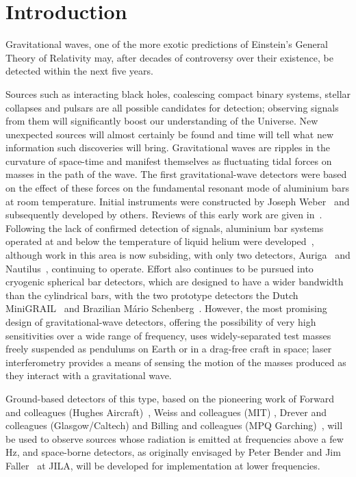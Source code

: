 \section{Introduction}
\label{section:introduction} 

Gravitational waves, one of the more exotic predictions of Einstein's General
Theory of Relativity may, after decades of controversy over their existence, be
detected within the next five years.


Sources such as interacting black holes, coalescing compact binary systems,
stellar collapses and pulsars are all possible candidates for detection;
observing signals from them will significantly boost our understanding of the
Universe. New unexpected sources will almost certainly be found and time will
tell what new information such discoveries will bring. Gravitational waves are
ripples in the curvature of space-time and manifest themselves as fluctuating
tidal forces on masses in the path of the wave. The first gravitational-wave
detectors were based on the effect of these forces on the fundamental resonant
mode of aluminium bars at room temperature. Initial instruments were constructed
by Joseph Weber~\cite{Weber1, Weber2} and subsequently developed by others.
Reviews of this early work are given in~\cite{Tyson, Douglass}. Following the
lack of confirmed detection of signals, aluminium bar systems operated at and
below the temperature of liquid helium were developed~\cite{Astone, Prodi,
Amaldi, Heng}, although work in this area is now subsiding, with only two
detectors, Auriga~\cite{AURIGA} and Nautilus~\cite{NAUTILUS}, continuing to
operate. Effort also continues to be pursued into cryogenic spherical bar
detectors, which are designed to have a wider bandwidth than the cylindrical
bars, with the two prototype detectors the Dutch MiniGRAIL~\cite{MiniGRAIL,
Gottardi:2007} and Brazilian M\'{a}rio Schenberg~\cite{Schenberg, Aguiar:2006}.
However, the most promising design of gravitational-wave detectors, offering the
possibility of very high sensitivities over a wide range of frequency, uses
widely-separated test masses freely suspended as pendulums on Earth or
in a drag-free craft in space; laser interferometry provides a means
of sensing the motion of the masses produced as they interact with a
gravitational wave.


Ground-based detectors of this type, based on the pioneering work of Forward
and colleagues (Hughes Aircraft)~\cite{Forward}, Weiss and colleagues (MIT)
\cite{Weiss}, Drever and colleagues (Glasgow/Caltech) \cite{Drever1,
Drever2} and Billing and colleagues (MPQ Garching)~\cite{Billing}, will be
used to observe sources whose radiation is emitted at frequencies above a few
Hz, and space-borne detectors, as originally envisaged by Peter Bender and Jim
Faller~\cite{BenderFaller1, BenderFaller2} at JILA, will be developed for
implementation at lower frequencies.



